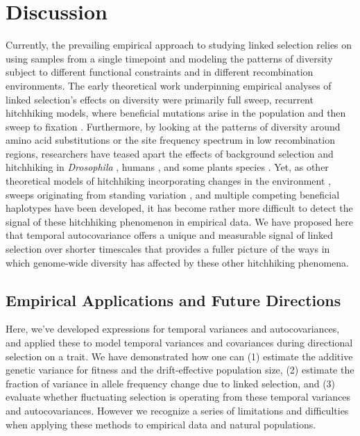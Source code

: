\documentclass[11pt]{article}
\begin{document}
\section{Discussion}

Currently, the prevailing empirical approach to studying linked selection
relies on using samples from a single timepoint and modeling the patterns of
diversity subject to different functional constraints and in different
recombination environments. The early theoretical work underpinning empirical
analyses of linked selection's effects on diversity were primarily full sweep,
recurrent hitchhiking models, where beneficial mutations arise in the
population and then sweep to fixation
\parencite{Maynard_Smith1974-lc,Stephan1992-jc,Kaplan1989-ld}. Furthermore, by
looking at the patterns of diversity around amino acid substitutions or the
site frequency spectrum in low recombination regions, researchers have teased
apart the effects of background selection and hitchhiking in \emph{Drosophila}
\parencite{Begun2007-bg,Elyashiv2016-vt}, humans
\parencite{Hernandez2011-gs,McVicker2009-ax}, and some plants species
\parencite{Nordborg2005-vt,Beissinger2016-cm,Schmid2005-on,Williamson2014-oy}.
Yet, as other theoretical models of hitchhiking incorporating changes in the
environment \parencite{Kopp2007-mc,Kopp2009-lo,Kopp2009-pj}, sweeps originating
from standing variation \parencite{Hermisson2005-hs}, and multiple competing
beneficial haplotypes \parencite{Pennings2006-lj} have been developed, it has
become rather more difficult to detect the signal of these hitchhiking
phenomenon in empirical data. We have proposed here that temporal autocovariance
offers a unique and measurable signal of linked selection over shorter
timescales that provides a fuller picture of the ways in which genome-wide
diversity has affected by these other hitchhiking phenomena. 

\subsection{Empirical Applications and Future Directions}

Here, we've developed expressions for temporal variances and autocovariances,
and applied these to model temporal variances and covariances during
directional selection on a trait. We have demonstrated how one can (1) estimate
the additive genetic variance for fitness and the drift-effective population
size, (2) estimate the fraction of variance in allele frequency change due to
linked selection, and (3) evaluate whether fluctuating selection is operating
from these temporal variances and autocovariances. However we recognize a
series of limitations and difficulties when applying these methods to empirical
data and natural populations.
\end{document}
